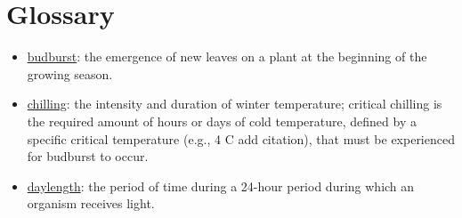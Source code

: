 \documentclass{article}
\begin{document}
\section* {Glossary}
\begin{itemize}
\item \underline{budburst}: the emergence of new leaves on a plant at the beginning of the growing season.
\item \underline{chilling}: the intensity and duration of winter temperature; critical chilling is the required amount of hours or days of cold temperature, defined by a specific critical temperature (e.g., 4 \degree C add citation), that must be experienced for budburst to occur.
\item \underline{daylength}: the period of time during a 24-hour period during which an organism receives light.


\end{itemize}
\end{document}
